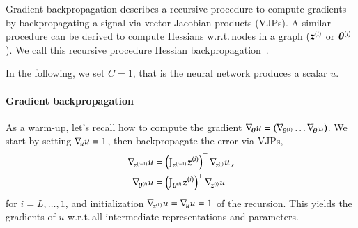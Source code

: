 Gradient backpropagation describes a recursive procedure to compute gradients by backpropagating a signal via vector-Jacobian products (VJPs).
A similar procedure can be derived to compute Hessians w.r.t.\,nodes in a graph (${\boldsymbol{z}}^{(i)}$ or ${\boldsymbol{\theta}}^{(i)}$).
We call this recursive procedure Hessian backpropagation~\citep{dangel2020modular}.

In the following, we set $C = 1$, that is the neural network produces a scalar $u$.

\paragraph{Gradient backpropagation} As a warm-up, let's recall how to compute the gradient $\nabla_{\!{{\boldsymbol{\theta}}}}u =
(\nabla_{\!{{\boldsymbol{\theta}}^{(1)}}} \dots \nabla_{\!{{\boldsymbol{\theta}}^{(L)}}})$. We start by setting $\nabla_{\!{u}}
u = 1$, then backpropagate the error via VJPs,
\begin{align}\label{eq:gradient-backpropagation}
  \begin{split}
    \nabla_{\!{{\boldsymbol{z}}^{(i-1)}}}u
    &=
      \left( \mathrm{J}_{{\boldsymbol{z}}^{(i-1)}} {\boldsymbol{z}}^{(i)} \right)^{\top} \nabla_{\!{{\boldsymbol{z}}^{(i)}}}u\,,
    \\
    \nabla_{\!{{\boldsymbol{\theta}}^{(i)}}}u
    &=
      \left( \mathrm{J}_{{\boldsymbol{\theta}}^{(i)}} {\boldsymbol{z}}^{(i)} \right)^{\top} \nabla_{\!{{\boldsymbol{z}}^{(i)}}}u\,
  \end{split}
\end{align}
for $i = L, \dots, 1$, and initialization $\nabla_{\!{{\boldsymbol{z}}^{(L)}}}u = \nabla_{\!{u}}u = 1$ of the recursion.
This yields the gradients of $u$ w.r.t.\,all intermediate representations and parameters.

